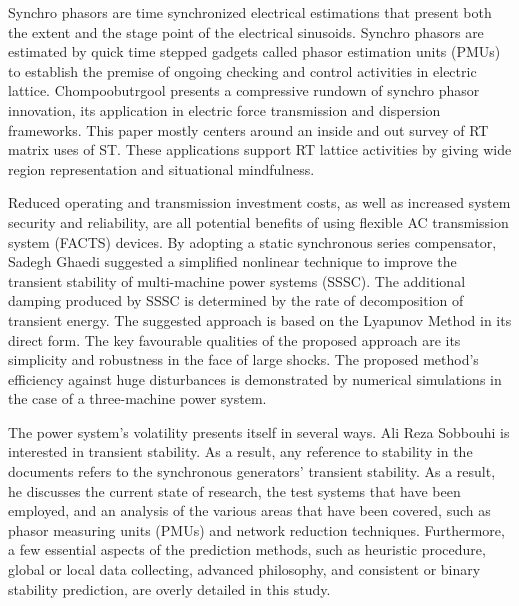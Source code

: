 Synchro phasors are time synchronized electrical estimations that present both the extent and the stage point of the electrical sinusoids. Synchro phasors are estimated by quick time stepped gadgets called phasor estimation units (PMUs) to establish the premise of ongoing checking and control activities in electric lattice. Chompoobutrgool \cite{L10} presents a compressive rundown of synchro phasor innovation, its application in electric force transmission and dispersion frameworks. This paper mostly centers around an inside and out survey of RT matrix uses of ST. These applications support RT lattice activities by giving wide region representation and situational mindfulness.

Reduced operating and transmission investment costs, as well as increased system security and reliability, are all potential benefits of using flexible AC transmission system (FACTS) devices. By adopting a static synchronous series compensator, Sadegh Ghaedi \cite{L11} suggested a simplified nonlinear technique to improve the transient stability of multi-machine power systems (SSSC). The additional damping produced by SSSC is determined by the rate of decomposition of transient energy. The suggested approach is based on the Lyapunov Method in its direct form. The key favourable qualities of the proposed approach are its simplicity and robustness in the face of large shocks. The proposed method's efficiency against huge disturbances is demonstrated by numerical simulations in the case of a three-machine power system.

The power system's volatility presents itself in several ways. Ali Reza Sobbouhi \cite{L12} is interested in transient stability. As a result, any reference to stability in the documents refers to the synchronous generators' transient stability. As a result, he discusses the current state of research, the test systems that have been employed, and an analysis of the various areas that have been covered, such as phasor measuring units (PMUs) and network reduction techniques. Furthermore, a few essential aspects of the prediction methods, such as heuristic procedure, global or local data collecting, advanced philosophy, and consistent or binary stability prediction, are overly detailed in this study.

